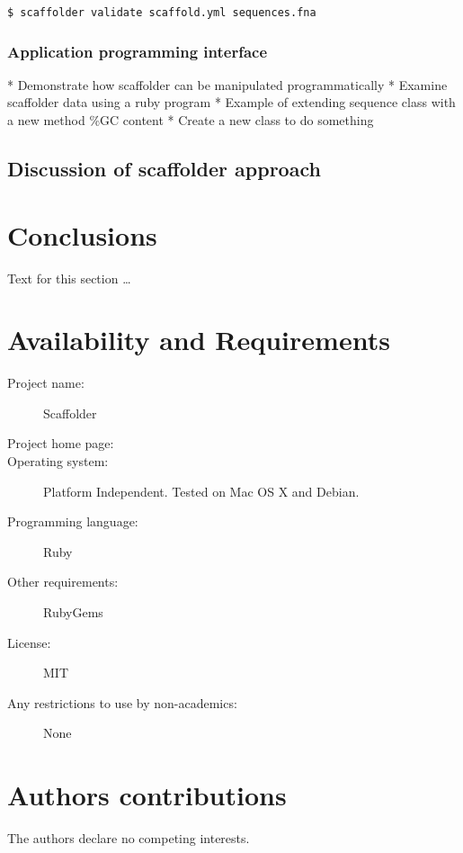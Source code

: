\documentclass[10pt]{bmc_article}
\newenvironment{bmcformat}{\begin{raggedright}\baselineskip20pt\sloppy\setboolean{publ}{false}}{\end{raggedright}\baselineskip20pt\sloppy}
\begin{document}
\begin{bmcformat}
\begin{verbatim}
$ scaffolder validate scaffold.yml sequences.fna
\end{verbatim}

\subsubsection*{Application programming interface} %

  * Demonstrate how scaffolder can be manipulated programmatically
  * Examine scaffolder data using a ruby program
  * Example of extending sequence class with a new method \%GC content
  * Create a new class to do something

\subsection*{Discussion of scaffolder approach} %

\section*{Conclusions} %

Text for this section \ldots

\section*{Availability and Requirements} %

  \begin{description}
    \item[Project name:] Scaffolder
    \item[Project home page:] \scaffolder
    \item[Operating system:] Platform Independent. Tested on Mac OS X and
    Debian.
    \item[Programming language:] Ruby
    \item[Other requirements:] RubyGems
    \item[License:] MIT
    \item[Any restrictions to use by non-academics:] None
  \end{description}

\section*{Authors contributions}
  The authors declare no competing interests.

\end{bmcformat}
\end{document}
